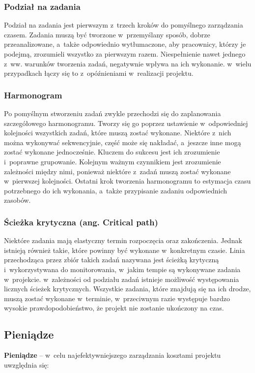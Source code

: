\documentclass[oneside,polski,logo]{amuthesis}
\begin{document}
\subsubsection {Podział na zadania}
Podział na zadania jest pierwszym z~trzech kroków do pomyślnego zarządzania czasem. Zadania muszą być tworzone w~przemyślany sposób, dobrze przeanalizowane, a~także odpowiednio wytłumaczone, aby pracownicy, którzy je podejmą, zrozumieli wszystko za pierwszym razem. Niespełnienie nawet jednego z~ww. warunków tworzenia zadań, negatywnie wpływa na ich wykonanie. w~wielu przypadkach łączy się to z~opóźnieniami w~realizacji projektu.

\subsubsection {Harmonogram}
Po pomyślnym stworzeniu zadań zwykle przechodzi się do zaplanowania szczegółowego harmonogramu. Tworzy się go poprzez ustawienie w~odpowiedniej kolejności wszystkich zadań, które muszą zostać wykonane. Niektóre z~nich można wykonywać sekwencyjnie, część może się nakładać, a~jeszcze inne mogą zostać wykonane jednocześnie. Kluczem do sukcesu jest ich zrozumienie i~poprawne grupowanie. Kolejnym ważnym czynnikiem jest zrozumienie zależności między nimi, ponieważ niektóre z~zadań muszą zostać wykonane w~pierwszej kolejności. Ostatni krok tworzenia harmonogramu to estymacja czasu potrzebnego do ich wykonania, a~także przypisanie zadaniu odpowiednich zasobów. 

\subsubsection {Ścieżka krytyczna (ang. Critical path)}
Niektóre zadania mają elastyczny termin rozpoczęcia oraz zakończenia. Jednak istnieją również takie, które powinny być wykonane w~konkretnym czasie. Linia przechodząca przez zbiór takich zadań nazywana jest ścieżką krytyczną i~wykorzystywana do monitorowania, w~jakim tempie są wykonywane zadania w~projekcie. w~zależności od podziału zadań istnieje możliwość występowania licznych ścieżek krytycznych. Wszystkie zadania, które znajdują się na ich drodze, muszą zostać wykonane w~terminie, w~przeciwnym razie występuje bardzo wysokie prawdopodobieństwo, że projekt nie zostanie ukończony na czas.

\subsection {Pieniądze}
\textbf{Pieniądze} – w~celu najefektywniejszego zarządzania kosztami projektu uwzględnia się:
\end{document}
